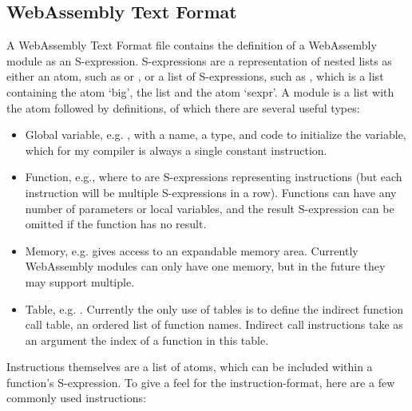 \subsection{WebAssembly Text Format}
A WebAssembly Text Format file contains the definition of a WebAssembly module as an S-expression. S-expressions are a representation of nested lists as either an atom, such as  or , or a list of S-expressions, such as , which is a list containing the atom `big', the list  and the atom `sexpr'. A module is a list with the atom  followed by definitions, of which there are several useful types:
\begin{itemize}
\item Global variable, e.g. , with a name, a type, and code to initialize the variable, which for my compiler is always a single constant instruction.
\item Function, e.g., where  to  are S-expressions representing instructions (but each instruction will be multiple S-expressions in a row). Functions can have any number of parameters or local variables, and the result S-expression can be omitted if the function has no result.
\item Memory, e.g.  gives access to an expandable memory area. Currently WebAssembly modules can only have one memory, but in the future they may support multiple.
\item Table, e.g. . Currently the only use of tables is to define the indirect function call table, an ordered list of function names. Indirect call instructions take as an argument the index of a function in this table.
\end{itemize}
Instructions themselves are a list of atoms, which can be included within a function's S-expression. To give a feel for the instruction-format, here are a few commonly used instructions:
